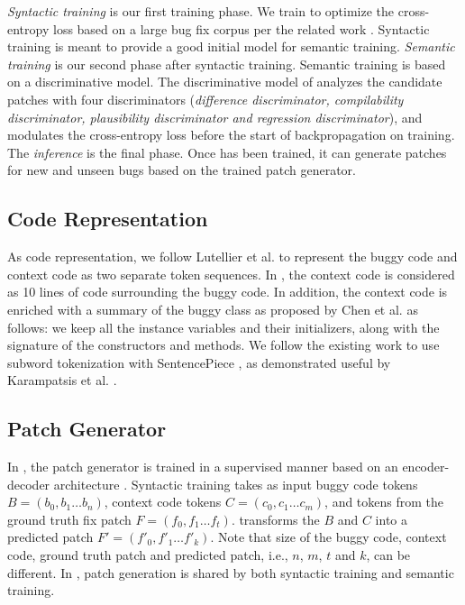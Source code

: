 \textit{Syntactic training} is our first training phase.
We train \approach to optimize the cross-entropy loss based on a large bug fix corpus per the related work \cite{CURE-icse21,CoCoNuT,SEQUENCER,deepfix,DLFix,Tufano-ICSE19,codit-tse20}. 
Syntactic training is meant to provide a good initial model  for semantic training. 
\textit{Semantic training} is our second phase after syntactic training.
Semantic training is based on a discriminative model.
The discriminative model of \approach analyzes the candidate patches with four discriminators (\textit{difference discriminator, compilability discriminator, plausibility discriminator and regression discriminator}), and  modulates the cross-entropy loss before the start of backpropagation on training.
The \textit{inference} is the final phase. Once \approach has been trained,  it can generate patches for new and unseen bugs based on the trained patch generator.

\subsection{Code Representation}
\label{sec:coderepresentation}
As code representation, we follow Lutellier et al. \cite{CoCoNuT} to represent the buggy code and context code as two separate token sequences.
In \approach, the context code is considered as 10 lines of code surrounding the buggy code.
In addition, the context code is enriched with a summary of the buggy class as proposed by Chen et al. \cite{SEQUENCER} as follows: we keep all the instance variables and their initializers, along with the signature of the constructors and methods. 
We follow the existing work \cite{CURE-icse21} to use subword tokenization with SentencePiece \cite{Kudo2018SentencePieceAS}, as demonstrated useful by Karampatsis et al. \cite{karampatsis2020big}.

\subsection{Patch Generator}
\label{sec:patch_generator}

In \approach, the patch generator is trained in a supervised manner based on an encoder-decoder architecture \cite{T5,attention-all-you-need}.
Syntactic training takes as input buggy code tokens $B = (b_0, b_1\ldots b_n )$, context code tokens $C = (c_0, c_1\ldots c_m )$, and tokens from the ground truth fix patch $F = (f_0, f_1\ldots f_t )$.
\approach transforms the $B$ and $C$ into a predicted patch  $F'= (f'_0, f'_1\ldots f'_k )$. 
Note that size of the buggy code, context code, ground truth patch and predicted patch, i.e., $n$, $m$, $t$ and $k$, can be different. 
In \approach, patch generation is shared by both syntactic training and semantic training.

